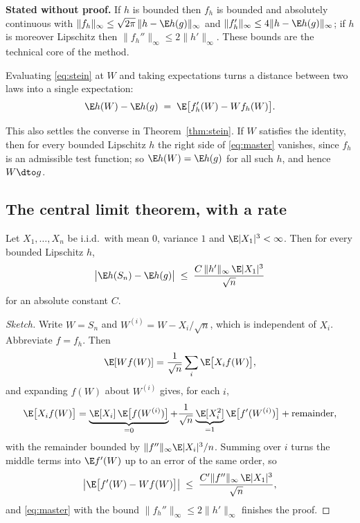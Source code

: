 \documentclass[11pt]{article}
\begin{document}
\begin{imported}
\textbf{Stated without proof.} If $h$ is bounded then $f_h$ is bounded and absolutely continuous with $\|f_h\|_\infty\le\sqrt{2\pi}\,\|h-\E h(g)\|_\infty$ and $\|f_h'\|_\infty\le 4\|h-\E h(g)\|_\infty$; if $h$ is moreover Lipschitz then $\|f_h''\|_\infty\le 2\|h'\|_\infty$. These bounds are the technical core of the method.
\end{imported}

Evaluating \eqref{eq:stein} at $W$ and taking expectations turns a distance between two laws into a single expectation:
\begin{equation}\label{eq:master}
\E h(W)-\E h(g)\;=\;\E\big[f_h'(W)-Wf_h(W)\big].
\end{equation}

This also settles the converse in Theorem~\ref{thm:stein}. If $W$ satisfies the identity, then for every bounded Lipschitz $h$ the right side of \eqref{eq:master} vanishes, since $f_h$ is an admissible test function; so $\E h(W)=\E h(g)$ for all such $h$, and hence $W\dto g$.

\subsection{The central limit theorem, with a rate}

\begin{theorem}\label{thm:be}
Let $X_1,\dots,X_n$ be i.i.d.\ with mean $0$, variance $1$ and $\E|X_1|^3<\infty$. Then for every bounded Lipschitz $h$,
\[
\big|\E h(S_n)-\E h(g)\big|\;\le\;\frac{C\,\|h'\|_\infty\,\E|X_1|^3}{\sqrt n}
\]
for an absolute constant $C$.
\end{theorem}

\begin{proof}[Sketch]
Write $W=S_n$ and $W^{(i)}=W-X_i/\sqrt n$, which is independent of $X_i$. Abbreviate $f=f_h$. Then
\[
\E[Wf(W)]=\frac{1}{\sqrt n}\sum_{i}\E\big[X_if(W)\big],
\]
and expanding $f(W)$ about $W^{(i)}$ gives, for each $i$,
\[
\E\big[X_if(W)\big]=\underbrace{\E[X_i]\,\E\big[f(W^{(i)})\big]}_{=0}
+\frac{1}{\sqrt n}\underbrace{\E[X_i^2]}_{=1}\E\big[f'(W^{(i)})\big]+\text{remainder},
\]
with the remainder bounded by $\|f''\|_\infty\E|X_i|^3/n$. Summing over $i$ turns the middle terms into $\E f'(W)$ up to an error of the same order, so
\[
\big|\E\big[f'(W)-Wf(W)\big]\big|\;\le\;\frac{C'\|f''\|_\infty\,\E|X_1|^3}{\sqrt n},
\]
and \eqref{eq:master} with the bound $\|f_h''\|_\infty\le2\|h'\|_\infty$ finishes the proof.
\end{proof}
\end{document}
